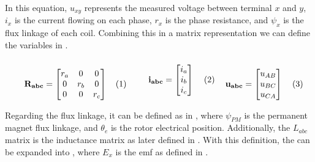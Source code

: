 In this equation, $u_{xy}$ represents the measured voltage between terminal $x$ and $y$, $i_x$ is the current flowing on each phase, $r_x$ is the phase resistance, and $\psi_x$ is the flux linkage of each coil. Combining this in a matrix representation we can define the variables in .

\vspace{0.5cm}
\begin{subequations}
	\noindent\begin{minipage}{.38\linewidth}
		\begin{equation}
			\mathbf{R_{abc}} = \begin{bmatrix}
				r_a & 0   & 0   \\
				0   & r_b & 0   \\
				0   & 0   & r_c \\
			\end{bmatrix}
		\end{equation}
	\end{minipage}%
	\begin{minipage}{.3\linewidth}
		\begin{equation}
			\mathbf{i_{abc}} = \begin{bmatrix}
				i_a \\
				i_b \\
				i_c \\
			\end{bmatrix}
		\end{equation}
	\end{minipage}%
	\begin{minipage}{.3\linewidth}
		\begin{equation}
			\mathbf{u_{abc}} = \begin{bmatrix}
				u_{AB} \\
				u_{BC} \\
				u_{CA} \\
			\end{bmatrix}
		\end{equation}
	\end{minipage}%
	\label{eq:variables_abc}
\end{subequations}
\vspace{0.5cm}

Regarding the flux linkage, it can be defined as in , where $\psi_{PM}$ is the permanent magnet flux linkage, and $\theta_e$ is the rotor electrical position. Additionally, the $L_{abc}$ matrix is the inductance matrix as later defined in . With this definition, the  can be expanded into , where $E_x$ is the \gls{emf} as defined in .

